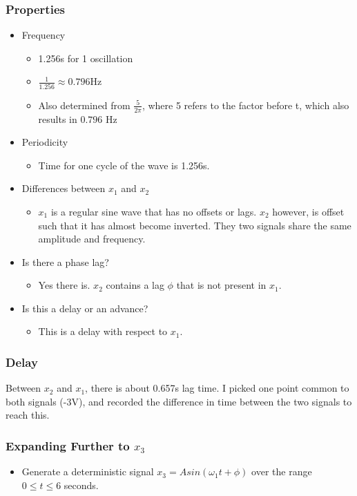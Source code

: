 \documentclass[12pt]{article}
\begin{document}
\subsubsection{Properties}
\begin{itemize}
\item Frequency
\begin{itemize}
\item 1.256s for 1 oscillation
\item $\frac{1}{1.256} \approx 0.796$Hz
\item Also determined from $\frac{5}{2\pi}$, where 5 refers to the factor before t, which also results in $0.796$ Hz
\end{itemize}
\item Periodicity
\begin{itemize}
\item Time for one cycle of the wave is 1.256s.
\end{itemize}
\item Differences between $x_1$ and $x_2$
\begin{itemize}
\item $x_1$ is a regular sine wave that has no offsets or lags. $x_2$ however, is offset such that it has almost become inverted. They two signals share the same amplitude and frequency.
\end{itemize}
\item Is there a phase lag?
\begin{itemize}
\item Yes there is. $x_2$ contains a lag $\phi$ that is not present in $x_1$.
\end{itemize}
\item Is this a delay or an advance?
\begin{itemize}
\item This is a delay with respect to $x_1$.
\end{itemize}
\end{itemize}

\subsubsection{Delay}
Between $x_2$ and $x_1$, there is about 0.657s lag time. I picked one point common to both signals (-3V), and recorded the difference in time between the two signals to reach this. 

\subsubsection{Expanding Further to $x_3$}
\begin{itemize}
\item Generate a deterministic signal $x_3=Asin(\omega_{1}t + \phi)$ over the range $0 \leq t \leq 6$ seconds.
\end{itemize}
\end{document}
